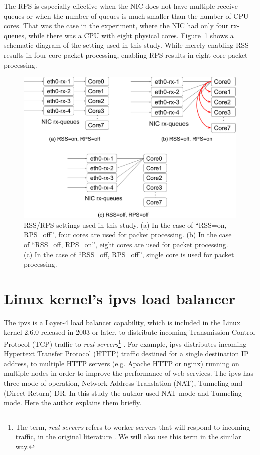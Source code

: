 The RPS is especially effective when the NIC does not have multiple receive queues or when the number of queues is 
much smaller than the number of CPU cores. 
That was the case in the experiment, where the NIC had only four rx-queues, 
while there was a CPU with eight physical cores.
Figure~\ref{Figs/rss-rps-none} shows a schematic diagram of the setting used in this study.
While merely enabling RSS results in four core packet processing, enabling RPS results in eight core packet processing.

\begin{figure}[h]
  \centering
  \includegraphics[width=0.8\columnwidth]{Figs/rss-rps-none}

  \par\bigskip
  \centering
  \begin{minipage}{0.9\columnwidth}
    \caption[RSS/RPS settings]{
      RSS/RPS settings used in this study.
      (a) In the case of \enquote{RSS=on, RPS=off}, four cores are used for packet processing.
      (b) In the case of \enquote{RSS=off, RPS=on}, eight cores are used for packet processing.
      (c) In the case of \enquote{RSS=off, RPS=off}, single core is used for packet processing.
    }
    \label{Figs/rss-rps-none}
  \end{minipage}
\end{figure}

\FloatBarrier

\section{Linux kernel's ipvs load balancer}

The ipvs is a Layer-4 load balancer capability, which is included in the Linux kernel 2.6.0 released in 2003 or later, 
to distribute incoming Transmission Control Protocol (TCP) traffic to 
{\em real servers}\footnote{The term, {\em real servers} refers to worker servers that will respond to incoming traffic, 
in the original literature \cite{Zhang2000}. We will also use this term in the similar way.} \cite{Zhang2000}. 
For example, ipvs distributes incoming Hypertext Transfer Protocol (HTTP) traffic destined for a single destination IP address, 
to multiple HTTP servers (e.g. Apache HTTP or nginx) running on multiple nodes in order to improve the performance of web services.
The ipvs has three mode of operation, Network Address Translation (NAT), Tunneling and (Direct Return) DR.
In this study the author used NAT mode and Tunneling mode.
Here the author explains them briefly.

